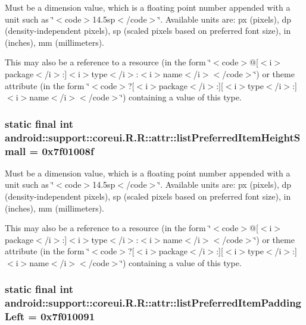 Must be a dimension value, which is a floating point number appended with a unit such as \char`\"{}$<$code$>$14.5sp$<$/code$>$\char`\"{}. Available units are: px (pixels), dp (density-independent pixels), sp (scaled pixels based on preferred font size), in (inches), mm (millimeters). 

This may also be a reference to a resource (in the form \char`\"{}$<$code$>$@\mbox{[}$<$i$>$package$<$/i$>$:\mbox{]}$<$i$>$type$<$/i$>$:$<$i$>$name$<$/i$>$$<$/code$>$\char`\"{}) or theme attribute (in the form \char`\"{}$<$code$>$?\mbox{[}$<$i$>$package$<$/i$>$:\mbox{]}\mbox{[}$<$i$>$type$<$/i$>$:\mbox{]}$<$i$>$name$<$/i$>$$<$/code$>$\char`\"{}) containing a value of this type. \hypertarget{classandroid_1_1support_1_1coreui_1_1_r_1_1attr_58d6ab36199b1192cac86007c71030b0}{
\subsubsection[{listPreferredItemHeightSmall}]{\setlength{\rightskip}{0pt plus 5cm}static final int android::support::coreui.R.R::attr::listPreferredItemHeightSmall = 0x7f01008f}}
\label{classandroid_1_1support_1_1coreui_1_1_r_1_1attr_58d6ab36199b1192cac86007c71030b0}


Must be a dimension value, which is a floating point number appended with a unit such as \char`\"{}$<$code$>$14.5sp$<$/code$>$\char`\"{}. Available units are: px (pixels), dp (density-independent pixels), sp (scaled pixels based on preferred font size), in (inches), mm (millimeters). 

This may also be a reference to a resource (in the form \char`\"{}$<$code$>$@\mbox{[}$<$i$>$package$<$/i$>$:\mbox{]}$<$i$>$type$<$/i$>$:$<$i$>$name$<$/i$>$$<$/code$>$\char`\"{}) or theme attribute (in the form \char`\"{}$<$code$>$?\mbox{[}$<$i$>$package$<$/i$>$:\mbox{]}\mbox{[}$<$i$>$type$<$/i$>$:\mbox{]}$<$i$>$name$<$/i$>$$<$/code$>$\char`\"{}) containing a value of this type. \hypertarget{classandroid_1_1support_1_1coreui_1_1_r_1_1attr_787f9c37d660826deabdeaca51ad4dc9}{
\subsubsection[{listPreferredItemPaddingLeft}]{\setlength{\rightskip}{0pt plus 5cm}static final int android::support::coreui.R.R::attr::listPreferredItemPaddingLeft = 0x7f010091}}
\label{classandroid_1_1support_1_1coreui_1_1_r_1_1attr_787f9c37d660826deabdeaca51ad4dc9}


